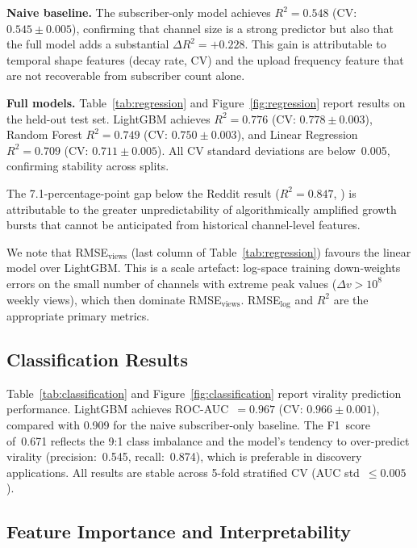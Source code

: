 \documentclass[journal,article,submit,pdftex,moreauthors]{Definitions/mdpi}
\begin{document}
\textbf{Naive baseline.}
The subscriber-only model achieves $R^2 = 0.548$
(CV: $0.545 \pm 0.005$), confirming that channel size is a strong
predictor but also that the full model adds a substantial
$\Delta R^2 = +0.228$.
This gain is attributable to temporal shape features (decay rate, CV)
and the upload frequency feature that are not recoverable from subscriber
count alone.

\textbf{Full models.}
Table~\ref{tab:regression} and Figure~\ref{fig:regression} report results
on the held-out test set.
LightGBM achieves $R^2 = 0.776$ (CV: $0.778 \pm 0.003$),
Random Forest $R^2 = 0.749$ (CV: $0.750 \pm 0.003$), and
Linear Regression $R^2 = 0.709$ (CV: $0.711 \pm 0.005$).
All CV standard deviations are below~0.005, confirming stability
across splits.

The 7.1-percentage-point gap below the Reddit result ($R^2 = 0.847$,
\cite{ref-paper1}) is attributable to the greater unpredictability of
algorithmically amplified growth bursts that cannot be anticipated from
historical channel-level features.

We note that RMSE$_\text{views}$ (last column of
Table~\ref{tab:regression}) favours the linear model over LightGBM.
This is a scale artefact: log-space training down-weights errors on the
small number of channels with extreme peak values ($\Delta v > 10^8$
weekly views), which then dominate RMSE$_\text{views}$.
RMSE$_\text{log}$ and $R^2$ are the appropriate primary metrics.

\subsection{Classification Results}
\label{sec:classification}

Table~\ref{tab:classification} and Figure~\ref{fig:classification} report
virality prediction performance.
LightGBM achieves ROC-AUC~$= 0.967$ (CV: $0.966 \pm 0.001$), compared
with 0.909 for the naive subscriber-only baseline.
The F1~score of~0.671 reflects the 9:1 class imbalance and the model's
tendency to over-predict virality (precision:~0.545, recall:~0.874),
which is preferable in discovery applications.
All results are stable across 5-fold stratified CV (AUC std~$\leq 0.005$).

\subsection{Feature Importance and Interpretability}
\label{sec:importance}
\end{document}
